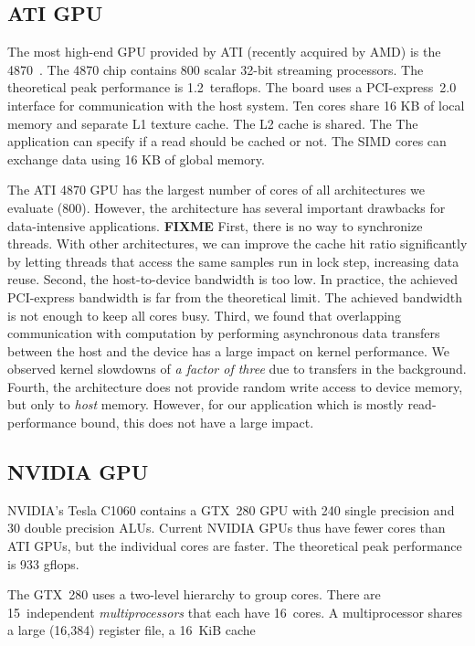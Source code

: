 \documentclass{article}
\begin{document}
\subsection{ATI GPU}

The most high-end GPU provided by ATI (recently acquired by AMD) is
the 4870~\cite{amd-manual}.  The 4870 chip contains 800 scalar 32-bit
streaming processors.  The theoretical peak performance is
1.2~teraflops. The board uses a PCI-express~2.0 interface
for communication with the host system.  Ten cores
share 16 KB of local memory and separate L1 texture cache.  The L2
cache is shared. The The application can specify if a read should be
cached or not.  The SIMD cores can exchange data using 16 KB of global
memory.

The ATI 4870 GPU has the largest number of cores of all architectures
we evaluate (800).  However, the architecture has several important
drawbacks for data-intensive applications.  \textbf{FIXME} First, there is no way to
synchronize threads. With other architectures, we can improve the
cache hit ratio significantly by letting threads that access the same
samples run in lock step, increasing data reuse.  Second, the
host-to-device bandwidth is too low. In practice, the achieved
PCI-express bandwidth is far from the theoretical limit. The achieved
bandwidth is not enough to keep all cores busy.  Third, we found that
overlapping communication with computation by performing asynchronous
data transfers between the host and the device has a large impact on
kernel performance. We observed kernel slowdowns of \emph{a factor of
three} due to transfers in the background.  Fourth, the architecture
does not provide random write access to device memory, but only to
\emph{host} memory. However, for our application which is mostly
read-performance bound, this does not have a large impact.


\subsection{NVIDIA GPU}

NVIDIA's Tesla C1060 contains a GTX~280 GPU with 240 single precision
and 30 double precision ALUs.  Current NVIDIA GPUs thus have fewer
cores than ATI GPUs, but the individual cores are faster.
The theoretical peak performance is 933 gflops.

The GTX~280 uses a two-level hierarchy to group cores.
There are 15~independent \emph{multiprocessors\/} that each have 16~cores.
A multiprocessor shares a large (16,384) register file, a 16~KiB cache
\end{document}
